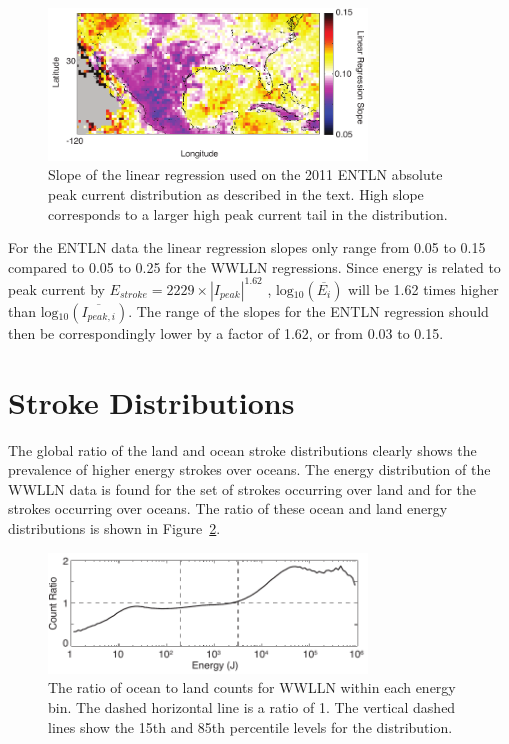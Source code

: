 \begin{figure}[ht!]
   \centering
   \noindent\includegraphics[width=20pc]{LandSea/Figures/4_regMapENTLN.pdf} 
   \caption{Slope of the linear regression used on the 2011 ENTLN absolute peak current distribution as described in the text. High slope corresponds to a larger high peak current tail in the distribution.}
   \label{landsea:fig:regMapENTLN}
\end{figure}

For the ENTLN data the linear regression slopes only range from 0.05 to 0.15 compared to 0.05 to 0.25 for the WWLLN regressions.
Since energy is related to peak current by $E_{stroke} = 2229 \times | I_{peak} | ^{1.62}$ \citep{Hutchins2012}, $\text{log$_{10}$}(\overline{E_i})$ will be 1.62 times higher than $\text{log$_{10}$}(\overline{I_{peak,i}})$.
The range of the slopes for the ENTLN regression should then be correspondingly lower by a factor of 1.62, or from 0.03 to 0.15.

\section{Stroke Distributions}

The global ratio of the land and ocean stroke distributions clearly shows the prevalence of higher energy strokes over oceans.
The energy distribution of the WWLLN data is found for the set of strokes occurring over land and for the strokes occurring over oceans.
The ratio of these ocean and land energy distributions is shown in Figure~\ref{landsea:fig:ratioComp}.

\begin{figure}[ht!]
   \centering
   \noindent\includegraphics[width=20pc]{LandSea/Figures/5_distribution.pdf} 
   \caption{The ratio of ocean to land counts for WWLLN within each energy bin. The dashed horizontal line is a ratio of 1. The vertical dashed lines show the 15th and 85th percentile levels for the distribution.}
   \label{landsea:fig:ratioComp}
\end{figure}

